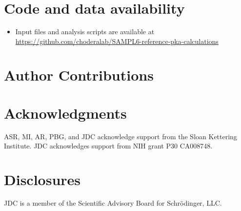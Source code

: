 \documentclass[9pt,lineno,final]{elife}
\begin{document}

\section{Code and data availability}

\begin{itemize}
	\item Input files and analysis scripts are available at \href{https://github.com/choderalab/SAMPL6-reference-pka-calculations}{https://github.com/choderalab/SAMPL6-reference-pka-calculations}
\end{itemize}

\section{Author Contributions}


\section{Acknowledgments}

ASR, MI, AR, PBG, and JDC acknowledge support from the Sloan Kettering Institute.
JDC acknowledges support from NIH grant P30 CA008748.

\section{Disclosures}

JDC is a member of the Scientific Advisory Board for Schr\"{o}dinger, LLC.
\end{document}
